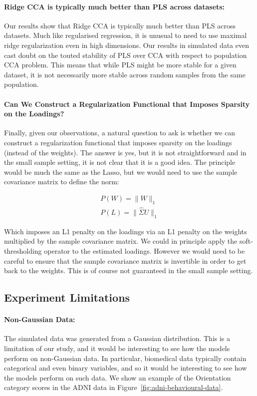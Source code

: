 \paragraph{Ridge CCA is typically much better than PLS across datasets:} Our results show that Ridge CCA is typically much better than PLS across datasets.
Much like regularised regression, it is unusual to need to use maximal ridge regularization even in high dimensions.
Our results in simulated data even cast doubt on the touted stability of PLS over CCA with respect to population CCA problem.
This means that while PLS might be more stable for a given dataset, it is not necessarily more stable across random samples from the same population.

\paragraph{Can We Construct a Regularization Functional that Imposes Sparsity on the Loadings?}
Finally, given our observations, a natural question to ask is whether we can construct a regularization functional that imposes sparsity on the loadings (instead of the weights).
The answer is yes, but it is not straightforward and in the small sample setting, it is not clear that it is a good idea.
The principle would be much the same as the Lasso, but we would need to use the sample covariance matrix to define the norm:

\begin{align}
    P(W)=\|W\|_1 \\
    P(L)=\|\hat{\Sigma}U\|_1
\end{align}

Which imposes an L1 penalty on the loadings via an L1 penalty on the weights multiplied by the sample covariance matrix.
We could in principle apply the soft-thresholding operator to the estimated loadings.
However we would need to be careful to ensure that the sample covariance matrix is invertible in order to get back to the weights.
This is of course not guaranteed in the small sample setting.

\subsection{Experiment Limitations}

\paragraph{Non-Gaussian Data:} The simulated data was generated from a Gaussian distribution.
This is a limitation of our study, and it would be interesting to see how the models perform on non-Gaussian data.
In particular, biomedical data typically contain categorical and even binary variables, and so it would be interesting to see how the models perform on such data.
We show an example of the Orientation category scores in the ADNI data in Figure~\ref{fig:adni-behavioural-data}.

